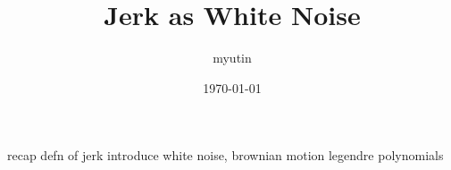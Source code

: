 \documentclass{article}
\begin{document}
\title{Jerk as White Noise}
\author{myutin}
\date{\today}
\maketitle

recap defn of jerk
introduce white noise, brownian motion
legendre polynomials
\end{document}
